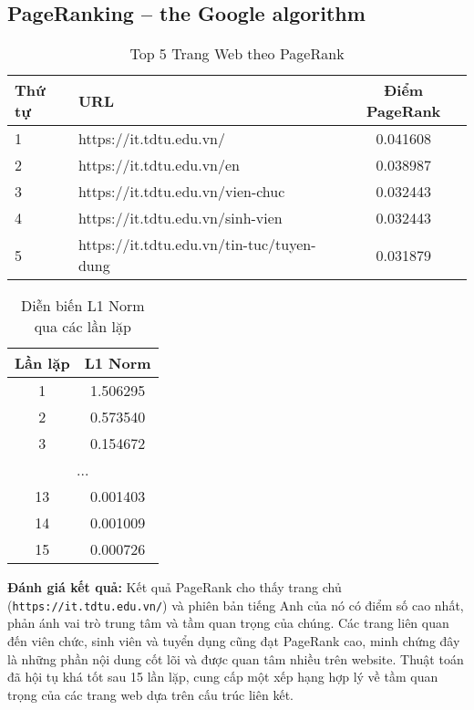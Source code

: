 \documentclass[conference]{IEEEtran}
\begin{document}
\subsection{PageRanking – the Google algorithm}
\begin{table}[h!]
    \centering
    \caption{Top 5 Trang Web theo PageRank}
    \label{tab:top_pagerank}
    \begin{tabular}{llc}
        \toprule
        \textbf{Thứ tự} & \textbf{URL} & \textbf{Điểm PageRank} \\
        \midrule
        1 & https://it.tdtu.edu.vn/ & 0.041608 \\
        2 & https://it.tdtu.edu.vn/en & 0.038987 \\
        3 & https://it.tdtu.edu.vn/vien-chuc & 0.032443 \\
        4 & https://it.tdtu.edu.vn/sinh-vien & 0.032443 \\
        5 & https://it.tdtu.edu.vn/tin-tuc/tuyen-dung & 0.031879 \\
        \bottomrule
    \end{tabular}
\end{table}
\begin{table}[h!]
    \centering
    \caption{Diễn biến L1 Norm qua các lần lặp}
    \label{tab:l1_norm_iterations}
    \begin{tabular}{cc}
        \toprule
        \textbf{Lần lặp} & \textbf{L1 Norm} \\
        \midrule
        1 & 1.506295 \\
        2 & 0.573540 \\
        3 & 0.154672 \\
        \midrule
        \multicolumn{2}{c}{...} \\ %
        \midrule
        13 & 0.001403 \\
        14 & 0.001009 \\
        15 & 0.000726 \\
        \bottomrule
    \end{tabular}
\end{table}

\textbf{Đánh giá kết quả:} Kết quả PageRank cho thấy trang chủ (\texttt{https://it.tdtu.edu.vn/}) và phiên bản tiếng Anh của nó có điểm số cao nhất, phản ánh vai trò trung tâm và tầm quan trọng của chúng. Các trang liên quan đến viên chức, sinh viên và tuyển dụng cũng đạt PageRank cao, minh chứng đây là những phần nội dung cốt lõi và được quan tâm nhiều trên website. Thuật toán đã hội tụ khá tốt sau 15 lần lặp, cung cấp một xếp hạng hợp lý về tầm quan trọng của các trang web dựa trên cấu trúc liên kết.
\end{document}

